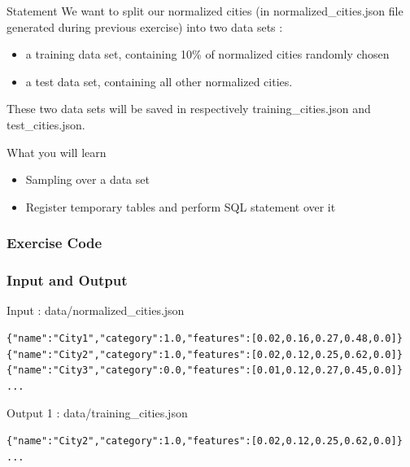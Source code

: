 \documentclass[slidetop,9pt,utf8]{beamer}
\begin{document}
\begin{CJK}{UTF8}{gbsn}
\begin{frame}
  \begin{block}{Statement}
    We want to split our normalized cities (in normalized\_cities.json file generated during previous exercise) into two data sets : 
    \begin{itemize}
      \item a training data set, containing 10\% of normalized cities randomly chosen
      \item a test data set, containing all other normalized cities. 
    \end{itemize}
    
    These two data sets will be saved in respectively training\_cities.json and test\_cities.json.
  \end{block}

  \begin{block}{What you will learn}
    \begin{itemize}
      \item Sampling over a data set
      \item Register temporary tables and perform SQL statement over it
    \end{itemize}
  \end{block}

\end{frame}

\begin{frame}
  \frametitle{Exercise Code}

  

\end{frame}

\begin{frame}[fragile]

  \frametitle{Input and Output}
  
  \begin{block}{Input : data/normalized\_cities.json}
    \begin{verbatim}
{"name":"City1","category":1.0,"features":[0.02,0.16,0.27,0.48,0.0]}
{"name":"City2","category":1.0,"features":[0.02,0.12,0.25,0.62,0.0]}
{"name":"City3","category":0.0,"features":[0.01,0.12,0.27,0.45,0.0]}
...
    \end{verbatim}
  \end{block}

  \begin{block}{Output 1 : data/training\_cities.json}
    \begin{verbatim}
{"name":"City2","category":1.0,"features":[0.02,0.12,0.25,0.62,0.0]}
...
    \end{verbatim}
  \end{block}


\end{frame}
\end{CJK}
\end{document}
